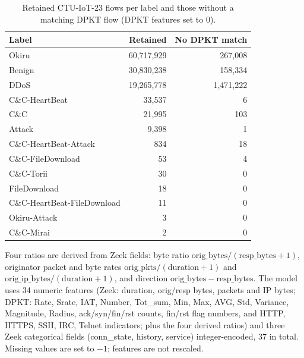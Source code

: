 \documentclass[journal]{IEEEtran}
\begin{document}
\begin{table}[h]
\centering\footnotesize
\caption{Retained CTU-IoT-23 flows per label and those without a matching DPKT flow (DPKT
features set to 0).}
\label{tab:ctu_labels}
\begin{tabular}{@{}lrr@{}}
\toprule
Label & Retained & No DPKT match \\
\midrule
Okiru & 60{,}717{,}929 & 267{,}008 \\
Benign & 30{,}830{,}238 & 158{,}334 \\
DDoS & 19{,}265{,}778 & 1{,}471{,}222 \\
C\&C-HeartBeat & 33{,}537 & 6 \\
C\&C & 21{,}995 & 103 \\
Attack & 9{,}398 & 1 \\
C\&C-HeartBeat-Attack & 834 & 18 \\
C\&C-FileDownload & 53 & 4 \\
C\&C-Torii & 30 & 0 \\
FileDownload & 18 & 0 \\
C\&C-HeartBeat-FileDownload & 11 & 0 \\
Okiru-Attack & 3 & 0 \\
C\&C-Mirai & 2 & 0 \\
\bottomrule
\end{tabular}
\end{table}

 Four ratios are derived from Zeek fields: byte ratio
$\mathrm{orig\_bytes}/(\mathrm{resp\_bytes}{+}1)$, originator packet and byte rates
$\mathrm{orig\_pkts}/(\mathrm{duration}{+}1)$ and $\mathrm{orig\_ip\_bytes}/(\mathrm{duration}{+}1)$,
and direction $\mathrm{orig\_bytes}{-}\mathrm{resp\_bytes}$. The model uses 34 numeric features
(Zeek: duration, orig/resp bytes, packets and IP bytes; DPKT: Rate, Srate, IAT, Number,
Tot\_sum, Min, Max, AVG, Std, Variance, Magnitude, Radius, ack/syn/fin/rst counts,
fin/rst flag numbers, and HTTP, HTTPS, SSH, IRC, Telnet indicators; plus the four derived
ratios) and three Zeek categorical fields (conn\_state, history, service) integer-encoded, 37
in total. Missing values are set to $-1$; features are not rescaled.
\end{document}
